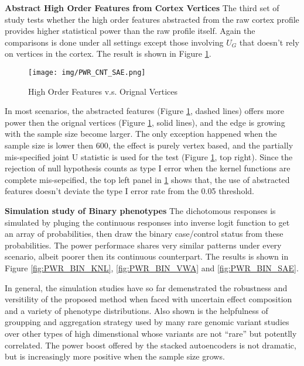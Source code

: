 \noindent \textbf{Abstract High Order Features from Cortex Vertices}
The third set of study tests whether the high order features abstracted from the raw cortex profile provides higher statistical power than the raw profile itself. Again the comparisons is done under all settings except those involving $U_G$ that doesn't rely on vertices in the cortex. The result is shown in Figure \ref{fig:PWR_CNT_SAE}.
\begin{figure}[!htbp]
\label{fig:PWR_CNT_SAE}
\centering
\texttt{[image: img/PWR\_CNT\_SAE.png]}
\caption{High Order Features v.s. Orignal Vertices}
\end{figure}
In most scenarios, the abstracted features (Figure \ref{fig:PWR_CNT_SAE}, dashed lines) offers more power then the orignal vertices (Figure \ref{fig:PWR_CNT_SAE}, solid lines), and the edge is growing with the sample size become larger. The only exception happened when the sample size is lower then 600, the effect is purely vertex based, and the partially mis-specified joint U statistic is used for the test (Figure \ref{fig:PWR_CNT_SAE}, top right). Since the rejection of null hypothesis counts as type I error when the kernel functions are complete mis-sepcified, the top left panel in \ref{fig:PWR_CNT_SAE} shows that, the use of abstracted features doesn't deviate the type I error rate from the 0.05 threshold.

\textbf{Simulation study of Binary phenotypes}
The dichotomous responses is simulated by pluging the continuous responses into inverse logit function to get an array of probabilities, then draw the binary case/control status from these probabilities. The power performace shares very similar patterns under every scenario, albeit poorer then its continuous counterpart. The results is shown in Figure \ref{fig:PWR_BIN_KNL}, \ref{fig:PWR_BIN_VWA} and \ref{fig:PWR_BIN_SAE}.

In general, the simulation studies have so far demenstrated the robustness and versitility of the proposed method when faced with uncertain effect composition and a variety of phenotype distributions. Also shown is the helpfulness of groupping and aggregation strategy used by many rare genomic variant studies over other types of high dimenstional whose variants are not ``rare'' but potentlly correlated. The power boost offered by the stacked autoencoders is not dramatic, but is increasingly more positive when the sample size grows.

